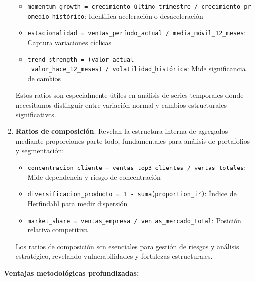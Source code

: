 \documentclass[
  letterpaper,
  DIV=11,
  numbers=noendperiod]{scrreprt}
\providecommand{\tightlist}{%
  \setlength{\itemsep}{0pt}\setlength{\parskip}{0pt}}
\begin{document}
\begin{enumerate}
  \begin{itemize}
  \tightlist
  \item
    \texttt{momentum\_growth\ =\ crecimiento\_último\_trimestre\ /\ crecimiento\_promedio\_histórico}:
    Identifica aceleración o desaceleración
  \item
    \texttt{estacionalidad\ =\ ventas\_período\_actual\ /\ media\_móvil\_12\_meses}:
    Captura variaciones cíclicas
  \item
    \texttt{trend\_strength\ =\ (valor\_actual\ -\ valor\_hace\_12\_meses)\ /\ volatilidad\_histórica}:
    Mide significancia de cambios
  \end{itemize}

  Estos ratios son especialmente útiles en análisis de series temporales
  donde necesitamos distinguir entre variación normal y cambios
  estructurales significativos.
\item
  \textbf{Ratios de composición}: Revelan la estructura interna de
  agregados mediante proporciones parte-todo, fundamentales para
  análisis de portafolios y segmentación:

  \begin{itemize}
  \tightlist
  \item
    \texttt{concentracion\_cliente\ =\ ventas\_top3\_clientes\ /\ ventas\_totales}:
    Mide dependencia y riesgo de concentración
  \item
    \texttt{diversificacion\_producto\ =\ 1\ -\ suma(proportion\_i²)}:
    Índice de Herfindahl para medir dispersión
  \item
    \texttt{market\_share\ =\ ventas\_empresa\ /\ ventas\_mercado\_total}:
    Posición relativa competitiva
  \end{itemize}

  Los ratios de composición son esenciales para gestión de riesgos y
  análisis estratégico, revelando vulnerabilidades y fortalezas
  estructurales.
\end{enumerate}

\textbf{Ventajas metodológicas profundizadas:}
\end{document}
